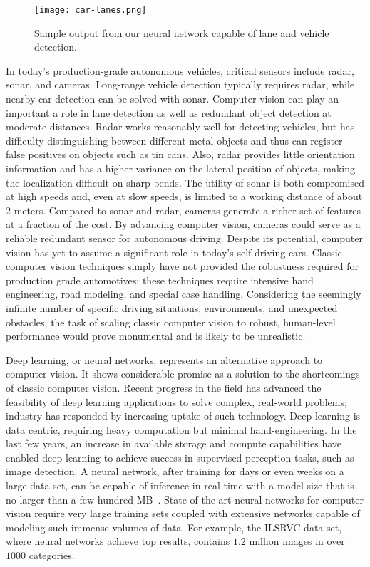 \documentclass[journal]{IEEEtran}
\begin{document}
\begin{figure}[t]
  \centering
    \texttt{[image: car-lanes.png]}
 \caption{Sample output from our neural network capable of lane and vehicle detection.}
 \label{fig:car-lanes}
\end{figure}
In today's production-grade autonomous vehicles, critical sensors include radar, sonar, and cameras. Long-range vehicle detection typically requires radar, while nearby car detection can be solved with sonar. Computer vision can play an important a role in lane detection as well as redundant object detection at moderate distances. Radar works reasonably well for detecting vehicles, but has difficulty distinguishing between different metal objects and thus can register false positives on objects such as tin cans. Also, radar provides little orientation information and has a higher variance on the lateral position of objects, making the localization difficult on sharp bends. The utility of sonar is both compromised at high speeds and, even at slow speeds, is limited to a working distance of about $2$ meters. Compared to sonar and radar, cameras generate a richer set of features at a fraction of the cost. By advancing computer vision, cameras could serve as a reliable redundant sensor for autonomous driving. Despite its potential, computer vision has yet to assume a significant role in today's self-driving cars. Classic computer vision techniques simply have not provided the robustness required for production grade automotives; these techniques require intensive hand engineering, road modeling, and special case handling. Considering the seemingly infinite number of specific driving situations, environments, and unexpected obstacles, the task of scaling classic computer vision to robust, human-level performance would prove monumental and is likely to be unrealistic.

Deep learning, or neural networks, represents an alternative approach to computer vision. It shows considerable promise as a solution to the shortcomings of classic computer vision. Recent progress in the field has advanced the feasibility of deep learning applications to solve complex, real-world  problems; industry has responded by increasing uptake of such technology. Deep learning is data centric, requiring heavy computation but minimal hand-engineering. In the last few years, an increase in available storage and compute capabilities have enabled deep learning to achieve success in supervised perception tasks, such as image detection. A neural network, after training for days or even weeks on a large data set, can be capable of inference in real-time with a model size that is no larger than a few hundred MB~\cite{krizhevsky-2012}. State-of-the-art neural networks for computer vision require very large training sets coupled with extensive networks capable of modeling such immense volumes of data. For example, the ILSRVC data-set, where neural networks achieve top results, contains $1.2$ million images in over $1000$ categories.
\end{document}
